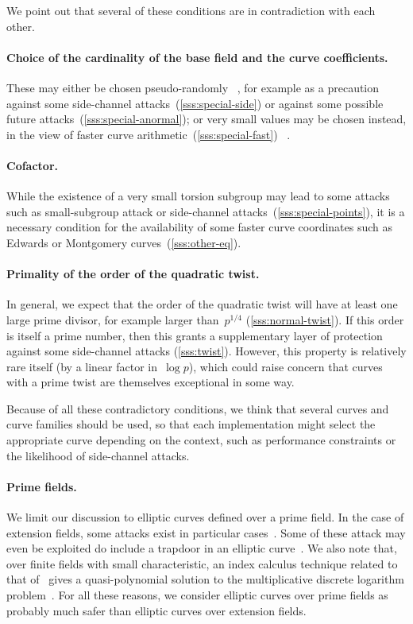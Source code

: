 \documentclass[twocolumn,letterpaper]{article}
\begin{document}
\bigbreak

We point out that several of these conditions are in contradiction
with each other.

\paragraph{Choice of the cardinality of the base field
and the curve coefficients.}
These may either be chosen pseudo-randomly~%
\cite{rfc5639,jorf2011ce}, for example
as a precaution against some side-channel attacks~(\ref{sss:special-side})
or against some possible future attacks~(\ref{sss:special-anormal});
or very small values may be chosen instead,
in the view of faster curve arithmetic~(\ref{sss:special-fast})~%
\cite{nist2000fips186-2,pkc2006bernstein,oscca2010sm2}.

\paragraph{Cofactor.}
While the existence of a very small torsion subgroup
may lead to some attacks such as
small-subgroup attack or side-channel attacks~(\ref{sss:special-points}),
it is a necessary condition for the availability
of some faster curve coordinates
such as Edwards or Montgomery curves~(\ref{sss:other-eq}).

\paragraph{Primality of the order of the quadratic twist.}
In general, we expect that the order of the quadratic twist
will have at least one large prime divisor,
for example larger than~$p^{1/4}$ (\ref{sss:normal-twist}).
If this order is itself a prime number,
then this grants a supplementary layer of protection
against some side-channel attacks (\ref{sss:twist}).
However, this property is relatively rare itself
(by a linear factor in~$\log p$),
which could raise concern that
curves with a prime twist are themselves exceptional in some way.

Because of all these contradictory conditions,
we think that several curves and curve families should be used,
so that each implementation might select the appropriate curve
depending on the context,
such as performance constraints or the likelihood of side-channel attacks.

\paragraph{Prime fields.}%
We limit our discussion to elliptic curves defined over a prime field.
In the case of extension fields,
some attacks exist in particular
cases~\cite{jc2013jv,rsa2004mtw,asia1999dgm,jc2002ghs}.
Some of these attack may even be exploited
do include a trapdoor in an elliptic curve~\cite{jc2006teske}.
We also note that, over finite fields with small characteristic,
an index calculus technique related to that of~\cite{jc2013jv}
gives a quasi-polynomial solution to
the multiplicative discrete logarithm problem~\cite{euro2014bgjt}.
For all these reasons, we consider elliptic curves over prime fields
as probably much safer than elliptic curves over extension fields.
\end{document}
